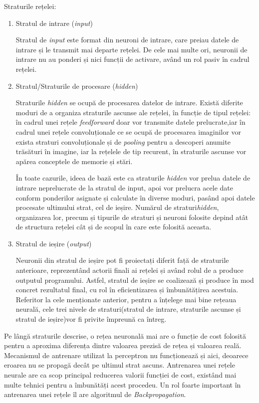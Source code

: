 Straturile rețelei:
\begin{enumerate}
    \item Stratul de intrare (\textit{input})
    
    Stratul de \textit{input} este format din neuroni de intrare, care preiau datele de intrare și le transmit mai departe rețelei. De cele mai multe ori, neuronii de intrare nu au ponderi și nici funcții de activare, având un rol pasiv în cadrul rețelei.
    
    \item Stratul/Straturile de procesare (\textit{hidden})
    
    Straturile \textit{hidden} se ocupă de procesarea datelor de intrare. Există diferite moduri de a organiza straturile ascunse ale rețelei, în funcție de tipul rețelei: în cadrul unei rețele \textit{feedforward} doar vor transmite datele prelucrate,iar în cadrul unei rețele convoluționale ce se ocupă de procesarea imaginilor vor exista straturi convoluționale și de \textit{pooling} pentru a descoperi anumite trăsături în imagine, iar la rețelele de tip recurent, în straturile ascunse vor apărea conceptele de memorie și stări.
    
    În toate cazurile, ideea de bază este ca straturile \textit{hidden} vor prelua datele de intrare neprelucrate de la stratul de input, apoi vor prelucra acele date conform ponderilor asignate și calculate în diverse moduri, pasând apoi datele procesate ultimului strat, cel de ieșire. Numărul de straturi\textit{hidden}, organizarea lor, precum și tipurile de straturi și neuroni folosite depind atât de structura rețelei cât și de scopul în care este folosită aceasta.
    
    \item Stratul de ieșire (\textit{output})
    
    Neuronii din stratul de ieșire pot fi proiectați diferit  față de straturile anterioare, reprezentând actorii finali ai rețelei și având rolul de a produce outputul programului. Astfel, stratul de ieșire se coalizează și produce în mod concret rezultatul final, cu rol în eficientizarea și îmbunătățirea acestuia.
    Referitor la cele menționate anterior, pentru a înțelege mai bine rețeaua neurală, cele trei nivele de straturi(stratul de intrare, straturile ascunse și stratul de ieșire)vor fi privite împreună ca întreg.

\end{enumerate}

Pe lângă straturile descrise, o rețea neuronală mai are o funcție de cost folosită pentru a aproxima diferența dintre valoarea prezisă de rețea și valoarea reală. Mecanismul de antrenare utilizat la perceptron nu funcționează și aici, deoarece eroarea nu se propagă decât pe ultimul strat ascuns. Antrenarea unei rețele neurale are ca scop principal reducerea valorii funcției de cost, existând mai multe tehnici pentru a îmbunătăți acest procedeu. Un rol foarte important în antrenarea unei rețele îl are algoritmul de \textit{Backpropagation}.

